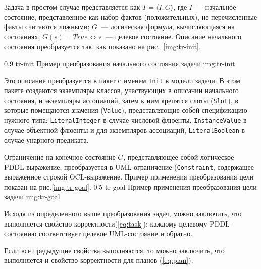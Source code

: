 Задача в простом случае представляется как $T = \langle I, G \rangle$, где $I$~--- начальное состояние, представленное как набор фактов (положительных), не перечисленные факты считаются ложными; $G$~--- логическая формула, вычисляющаяся на состояниях, $G(s) = True \Leftrightarrow s$~--- целевое состояние. 
Описание начального состояния преобразуется так, как показано на рис.~\ref{img:tr-init}.


{0.9}
{tr-init}
{Пример преобразования начального состояния задачи}
{img:tr-init}

Это описание преобразуется в пакет с именем \texttt{Init} в модели задачи.
В этом пакете создаются экземпляры классов, участвующих в описании начального состояния, и экземпляры ассоциаций, затем к ним крепятся слоты (\texttt{Slot}), в которые помещаются значения (\texttt{Value}), представляющие собой 
спецификацию нужного типа: \texttt{LiteralInteger} в случае числовой флюенты, \texttt{InstanceValue} в случае объектной флюенты и для экземпляров ассоциаций, \texttt{LiteralBoolean} в случае унарного предиката.

Ограничение на конечное состояние $G$, представляющее собой логическое PDDL-выражение, преобразуется в UML-ограничение  (\texttt{Constraint}, содержащее выраженное строкой OCL-выражение.
Пример применения преобразования цели показан на рис.\ref{img:tr-goal}.
{0.5}
{tr-goal}
{Пример применения преобразования цели задачи}
{img:tr-goal}

Исходя из определенного выше преобразования задач, можно заключить, что выполняется свойство корректности(\ref{eq:task}): каждому целевому PDDL-состоянию соответствует целевое UML-состояние и обратно.

Если все предыдущие свойства выполняются, то можно заключить, что
выполняется и свойство корректности для планов (\ref{eq:plan}).

